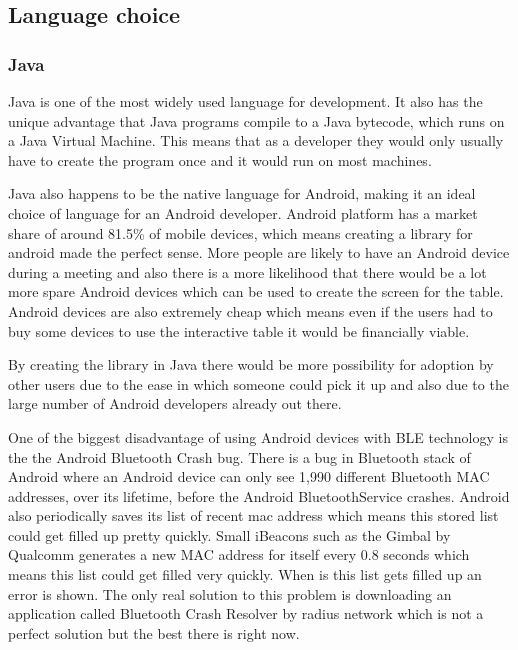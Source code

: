 \subsection{Language choice}


\subsubsection{Java}

Java is one of the most widely used language for development. It also
has the unique advantage that Java programs compile to a Java bytecode,
which runs on a Java Virtual Machine. This means that as a developer
they would only usually have to create the program once and it would
run on most machines. 

Java also happens to be the native language for Android, making it
an ideal choice of language for an Android developer. Android platform
has a market share of around 81.5\% of mobile devices\cite{market-share}, which means
creating a library for android made the perfect sense. More people
are likely to have an Android device during a meeting and also there
is a more likelihood that there would be a lot more spare Android devices
which can be used to create the screen for the table. Android devices
are also extremely cheap which means even if the users had to buy
some devices to use the interactive table it would be financially viable\cite{cheap-android}.

By creating the library in Java there would be more possibility for
adoption by other users due to the ease in which someone could pick
it up and also due to the large number of Android developers already out there. 


One of the biggest disadvantage of using Android devices with BLE
technology is the the Android Bluetooth Crash bug\cite{bluetooth-share}.
There is a bug in Bluetooth stack of Android where an Android device
can only see 1,990 different Bluetooth MAC addresses, over its lifetime, before the Android
BluetoothService crashes. Android also periodically saves its list
of recent mac address which means this stored list could get filled
up pretty quickly. Small iBeacons such as the Gimbal by Qualcomm generates
a new MAC address for itself every 0.8 seconds which means this list
could get filled very quickly. When is this list gets filled up an
error is shown. The only real solution to this
problem is downloading an application called Bluetooth Crash Resolver by radius
network which is not a perfect solution but the best there is right
now.


